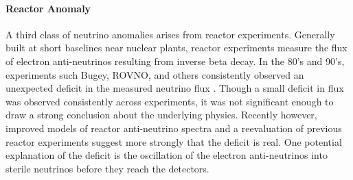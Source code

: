 

\paragraph{Reactor Anomaly}
A third class of neutrino anomalies arises from reactor experiments. Generally built at short baselines near nuclear plants, reactor experiments measure the flux of electron anti-neutrinos resulting from inverse beta decay. In the 80's and 90's, experiments such Bugey, ROVNO, and others consistently observed an unexpected deficit in the measured neutrino flux \cite{bib:bugey} \cite{bib:rovno}. Though a small deficit in flux was observed consistently across experiments, it was not significant enough to draw a strong conclusion about the underlying physics.  Recently however, improved models of reactor anti-neutrino spectra \cite{bib:improvedReactor} and a reevaluation of previous reactor experiments \cite{bib:reactorGeneral} suggest more strongly that the deficit is real.  One potential explanation of the deficit is the oscillation of the electron anti-neutrinos into sterile neutrinos before they reach the detectors.  

